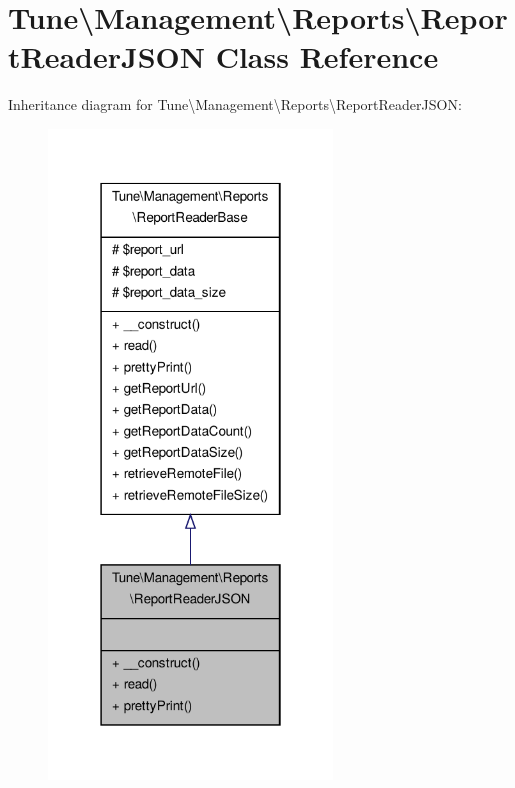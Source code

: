 \hypertarget{classTune_1_1Management_1_1Reports_1_1ReportReaderJSON}{\section{Tune\textbackslash{}Management\textbackslash{}Reports\textbackslash{}Report\-Reader\-J\-S\-O\-N Class Reference}
\label{classTune_1_1Management_1_1Reports_1_1ReportReaderJSON}
}


Inheritance diagram for Tune\textbackslash{}Management\textbackslash{}Reports\textbackslash{}Report\-Reader\-J\-S\-O\-N\-:
\nopagebreak
\begin{figure}[H]
\begin{center}
\leavevmode
\includegraphics[width=214pt]{classTune_1_1Management_1_1Reports_1_1ReportReaderJSON__inherit__graph}
\end{center}
\end{figure}


